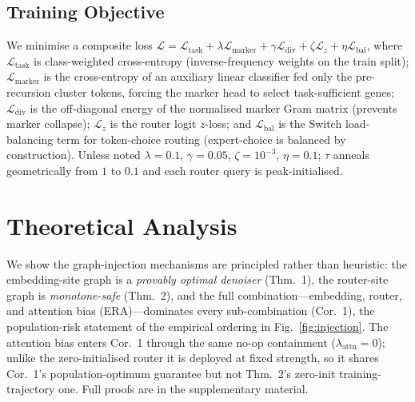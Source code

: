 \documentclass[letterpaper]{article}
\begin{document}
\subsection{Training Objective}
We minimise a composite loss
$\mathcal{L} = \mathcal{L}_{\mathrm{task}} + \lambda\mathcal{L}_{\mathrm{marker}}
+ \gamma\mathcal{L}_{\mathrm{div}} + \zeta\mathcal{L}_{z} + \eta\mathcal{L}_{\mathrm{bal}}$,
where $\mathcal{L}_{\mathrm{task}}$ is class-weighted cross-entropy (inverse-frequency
weights on the train split); $\mathcal{L}_{\mathrm{marker}}$ is the cross-entropy of
an auxiliary linear classifier fed only the pre-recursion cluster tokens, forcing the
marker head to select task-sufficient genes;
$\mathcal{L}_{\mathrm{div}}$ is the off-diagonal energy of the normalised marker Gram
matrix (prevents marker collapse); $\mathcal{L}_{z}$ is the router logit $z$-loss; and
$\mathcal{L}_{\mathrm{bal}}$ is the Switch load-balancing term
\cite{shazeer2017outrageously} for token-choice routing (expert-choice is balanced by
construction). Unless noted $\lambda{=}0.1$, $\gamma{=}0.05$, $\zeta{=}10^{-3}$,
$\eta{=}0.1$; $\tau$ anneals geometrically from $1$ to $0.1$ and each router query is
peak-initialised.

\section{Theoretical Analysis}
\label{sec:theory}
We show the graph-injection mechanisms are principled rather than heuristic: the embedding-site graph
is a \emph{provably optimal denoiser} (Thm.~1), the router-site graph is \emph{monotone-safe}
(Thm.~2), and the full combination---embedding, router, and attention bias (ERA)---dominates every
sub-combination (Cor.~1), the population-risk statement of the empirical ordering in
Fig.~\ref{fig:injection}. The attention bias enters Cor.~1 through the same no-op containment
($\lambda_{\mathrm{attn}}{=}0$); unlike the zero-initialised router it is deployed at fixed strength,
so it shares Cor.~1's population-optimum guarantee but not Thm.~2's zero-init training-trajectory one.
Full proofs are in the supplementary material.

\begin{table}[!b]
\centering
{}
\caption{\textbf{Main results: the efficiency ladder (5-fold CV).} Macro-F1 mean$\pm$SD; the
\colorbox{bestgreen}{best per column} is highlighted; Avg is over all $14$ datasets. The
weight-shared adaptive-recursion backbone (Recursive, MoR) matches the vanilla transformer at
$4\times$ fewer parameters; the accuracy gain arrives only with our learned interaction graph
(bioMoR), at the same parameter and FLOP budget. Multi-omics columns: Prostate, Bladder, Stomach are the Reactome multi-omics cancer cohorts; Pan-MC, Pan-Ex, Pan-3M are pan-cancer with mutation$+$CNV, expression, and tri-modal (all three) inputs.}
\label{tab:main_cv5}\label{tab:learned}\label{tab:ladder}
\end{table}
\end{document}
